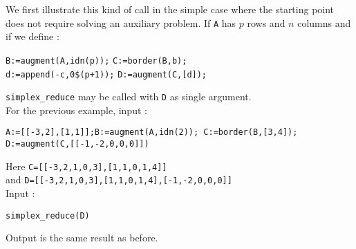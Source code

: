 \documentclass[a4paper,11pt]{book}
\begin{document}
We first illustrate this kind
of call in the simple case where the starting point does not
require solving an auxiliary problem.
If {\tt A} has $p$ rows and $n$ columns and if we define :
\begin{center}
{\tt B:=augment(A,idn(p));} {\tt C:=border(B,b);} \\
{\tt d:=append(-c,0\$(p+1));} {\tt D:=augment(C,[d]);}
\end{center}
{\tt simplex\_reduce} may be called with {\tt D} as single argument.\\
For the previous example, input :
\begin{center}{\tt A:=[[-3,2],[1,1]];B:=augment(A,idn(2)); C:=border(B,[3,4]);
D:=augment(C,[[-1,-2,0,0,0]])}\end{center}
Here
{\tt C=[[-3,2,1,0,3],[1,1,0,1,4]]}\\
and {\tt D=[[-3,2,1,0,3],[1,1,0,1,4],[-1,-2,0,0,0]]}\\
Input :
\begin{center}{\tt simplex\_reduce(D)}\end{center}
Output is the same result as before.
\end{document}
